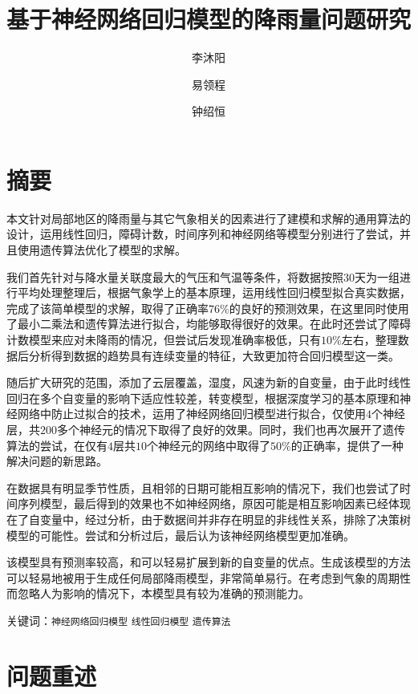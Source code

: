 \documentclass[UTF8]{ctexart}
\title{基于神经网络回归模型的降雨量问题研究}
\author{李沐阳 \and 易领程 \and 钟绍恒}
\begin{document}
  \maketitle

  \newpage

  \tableofcontents


  \newpage

  \section{摘要}

本文针对局部地区的降雨量与其它气象相关的因素进行了建模和求解的通用算法的设计，运用线性回归，障碍计数，时间序列和神经网络等模型分别进行了尝试，并且使用遗传算法优化了模型的求解。

我们首先针对与降水量关联度最大的气压和气温等条件，将数据按照$30$天为一组进行平均处理整理后，根据气象学上的基本原理，运用线性回归模型拟合真实数据，完成了该简单模型的求解，取得了正确率$76 \%$的良好的预测效果，在这里同时使用了最小二乘法和遗传算法进行拟合，均能够取得很好的效果。在此时还尝试了障碍计数模型来应对未降雨的情况，但尝试后发现准确率极低，只有$10\%$左右，整理数据后分析得到数据的趋势具有连续变量的特征，大致更加符合回归模型这一类。

随后扩大研究的范围，添加了云层覆盖，湿度，风速为新的自变量，由于此时线性回归在多个自变量的影响下适应性较差，转变模型，根据深度学习的基本原理和神经网络中防止过拟合的技术，运用了神经网络回归模型进行拟合，仅使用$4$个神经层，共$200$多个神经元的情况下取得了良好的效果。同时，我们也再次展开了遗传算法的尝试，在仅有$4$层共$10$个神经元的网络中取得了$50\%$的正确率，提供了一种解决问题的新思路。

在数据具有明显季节性质，且相邻的日期可能相互影响的情况下，我们也尝试了时间序列模型，最后得到的效果也不如神经网络，原因可能是相互影响因素已经体现在了自变量中，经过分析，由于数据间并非存在明显的非线性关系，排除了决策树模型的可能性。尝试和分析过后，最后认为该神经网络模型更加准确。

该模型具有预测率较高，和可以轻易扩展到新的自变量的优点。生成该模型的方法可以轻易地被用于生成任何局部降雨模型，非常简单易行。在考虑到气象的周期性而忽略人为影响的情况下，本模型具有较为准确的预测能力。

关键词：\texttt{神经网络回归模型}  \texttt{线性回归模型}  \texttt{遗传算法}

  \newpage

  \section{问题重述}
\end{document}
